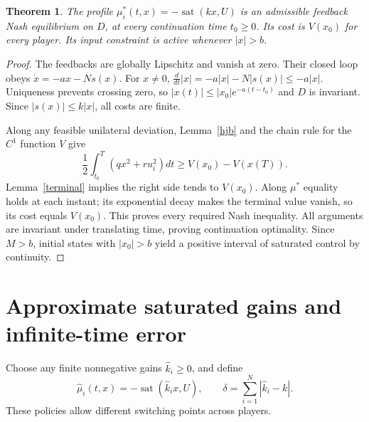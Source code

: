 \documentclass[11pt]{article}
\newtheorem{theorem}{Theorem}
\theoremstyle{remark}
\newcommand{\sat}{\operatorname{sat}}
\begin{document}
\begin{theorem}\label{nash}
The profile $\mu_i^*(t,x)=-\sat(kx,U)$ is an admissible feedback Nash equilibrium on $D$, at every continuation time $t_0\geq0$. Its cost is $V(x_0)$ for every player. Its input constraint is active whenever $|x|>b$.
\end{theorem}
\begin{proof}
The feedbacks are globally Lipschitz and vanish at zero. Their closed loop obeys $\dot x=-ax-Ns(x)$. For $x\ne0$,
$\frac{d}{dt}|x|=-a|x|-N|s(x)|\leq-a|x|$.
Uniqueness prevents crossing zero, so
$|x(t)|\leq|x_0|e^{-a(t-t_0)}$ and $D$ is invariant. Since $|s(x)|\leq k|x|$, all costs are finite.

Along any feasible unilateral deviation, Lemma~\ref{hjb} and the chain rule for the $C^1$ function $V$ give
\[
 \frac12\int_{t_0}^T(qx^2+ru_i^2)dt
 \geq V(x_0)-V(x(T)).
\]
Lemma~\ref{terminal} implies the right side tends to $V(x_0)$. Along $\mu^*$ equality holds at each instant; its exponential decay makes the terminal value vanish, so its cost equals $V(x_0)$. This proves every required Nash inequality. All arguments are invariant under translating time, proving continuation optimality. Since $M>b$, initial states with $|x_0|>b$ yield a positive interval of saturated control by continuity.
\end{proof}

\section{Approximate saturated gains and infinite-time error}
Choose any finite nonnegative gains $\widehat k_i\geq0$, and define
\[
 \widehat\mu_i(t,x)=-\sat(\widehat k_i x,U),\qquad
 \delta=\sum_{i=1}^N|\widehat k_i-k|.
\]
These policies allow different switching points across players.
\end{document}
